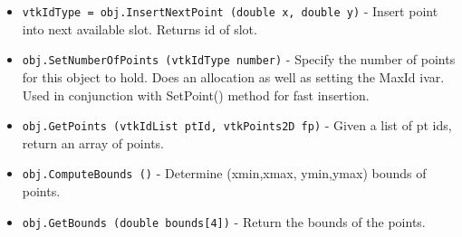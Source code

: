 \begin{itemize}
\item  \verb|vtkIdType = obj.InsertNextPoint (double x, double y)| -  Insert point into next available slot. Returns id of slot.

\item  \verb|obj.SetNumberOfPoints (vtkIdType number)| -  Specify the number of points for this object to hold. Does an
 allocation as well as setting the MaxId ivar. Used in conjunction with
 SetPoint() method for fast insertion.

\item  \verb|obj.GetPoints (vtkIdList ptId, vtkPoints2D fp)| -  Given a list of pt ids, return an array of points.

\item  \verb|obj.ComputeBounds ()| -  Determine (xmin,xmax, ymin,ymax) bounds of points.

\item  \verb|obj.GetBounds (double bounds[4])| -  Return the bounds of the points.

\end{itemize}
